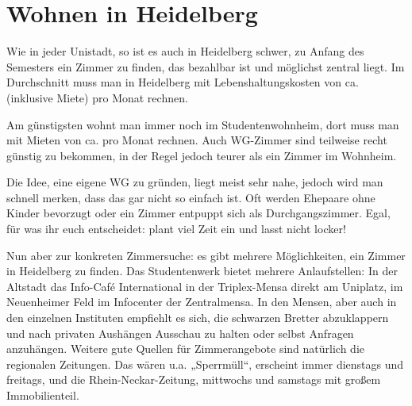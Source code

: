 \section{Wohnen in Heidelberg}


Wie in jeder Unistadt, so ist es auch in Heidelberg schwer, zu Anfang des Semesters ein Zimmer zu finden, das bezahlbar ist und möglichst zentral liegt. Im Durchschnitt muss man in Heidelberg mit Lebenshaltungskosten von ca.  (inklusive Miete) pro Monat rechnen.

Am günstigsten wohnt man immer noch im Studentenwohnheim, dort muss man mit Mieten von ca.  pro Monat rechnen. Auch WG-Zimmer sind teilweise recht günstig zu bekommen, in der Regel jedoch teurer als ein Zimmer im Wohnheim.

Die Idee, eine eigene WG zu gründen, liegt meist sehr nahe, jedoch wird man schnell merken, dass das gar nicht so einfach ist. Oft werden Ehepaare ohne Kinder bevorzugt oder ein Zimmer entpuppt sich als Durchgangszimmer. Egal, für was ihr euch entscheidet: plant viel Zeit ein und lasst nicht locker!

Nun aber zur konkreten Zimmersuche: es gibt mehrere Möglichkeiten, ein Zimmer in Heidelberg zu finden. Das Studentenwerk bietet mehrere Anlaufstellen: In der Altstadt das Info-Café International in der Triplex-Mensa direkt am Uniplatz, im Neuenheimer Feld im Infocenter der Zentralmensa. In den Mensen, aber auch in den einzelnen Instituten empfiehlt es sich, die schwarzen Bretter abzuklappern und nach privaten Aushängen Ausschau zu halten oder selbst Anfragen anzuhängen. Weitere gute Quellen für Zimmerangebote sind natürlich die regionalen Zeitungen. Das wären u.a. „Sperrmüll“, erscheint immer dienstags und freitags, und die Rhein-Neckar-Zeitung, mittwochs und samstags mit großem Immobilienteil. %


